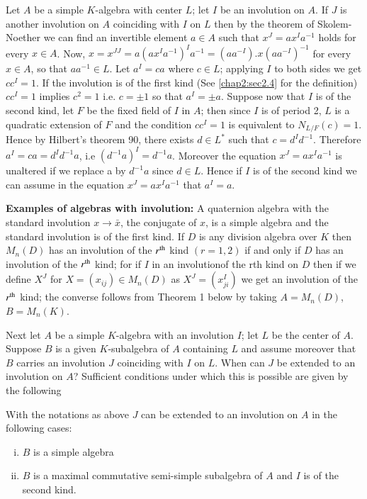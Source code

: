 Let $A$ be a simple $K$-algebra with center $L$; let $I$ be an
involution on $A$. If $J$ is another involution on $A$ coinciding with
$I$ on $L$ then by the theorem of Skolem-Noether we can find an
invertible element $a \in A$ such that $x^J = ax^I a^{-1}$ holds for
every $x \in A$. Now, $x = x^{JJ} = a (ax^I a^{-1})^I a^{-1} =
(aa^{-I}). x (aa^{-I})^{-1}$ for every $x \in A$, so that $aa^{-1} \in
L$. Let $a^{I}=ca$ where $c \in L$; applying $I$ to both sides we get
$cc^I = 1$. If the involution is of the first kind (See
\ref{chap2:sec2.4} for the 
definition) $cc^I = 1$ implies $c^2 = 1$ i.e. $c = \pm 1$ so that $a^I =
\pm a $. Suppose now that $I$ is of the second kind, let $F$ be the
fixed field of $I$ in $A$; then since $I$ is of period 2, $L$ is a
quadratic extension of $F$ and the condition $cc^I = 1$ is equivalent
to $N_{L/F} (c) = 1$. Hence by Hilbert's theorem 90, there exists
$d \in L^*$ such that $c = d^I d^{-1}$. Therefore $a^I = ca = d^I
d^{-1}a$, i.e $(d^{-1}a)^I = d^{-1} a$. Moreover the equation $x^J =
ax^I a^{-1}$ is unaltered if we replace a by $d^{-1}a$ since $d \in
L$. Hence if $I$ is of the second kind we can assume in the equation
$x^J = ax^I a^{-1}$ that $a^I = a$. 

  
\medskip
\noindent\textbf{Examples of algebras with involution:}
  A quaternion algebra with the standard involution $x \to \bar{x}$,
  the conjugate of $x$, is a simple algebra and the standard
  involution is of the first kind. If $D$ is any division algebra
  over $K$ then $M_n(D)$ has an involution of the $r^{\rm th}$ kind $(r =
  1,2)$ if and only if $D$ has an involution of the $r^{\rm th}$ kind; for
  if $I$ in an involution\pageoriginale of the rth kind on $D$ then if
  we define 
  $X^J$ for $X = (x_{ij}) \in M_n (D) $ as $X^J = (x^I_{ji})$  we get
  an involution of the $r^{\rm th}$ kind; the converse follows from Theorem 1
  below by taking $A = M_n(D)$, $B = M_n (K)$. 
  
  Next let $A$ be a simple $K$-algebra with an involution $I$; let $L$ be
  the center of $A$. Suppose $B$ is a given $K$-subalgebra of $A$
  containing $L$ and assume moreover that $B$ carries an involution
  $J$ coinciding with $I$ on $L$. When can $J$ be extended to an
  involution on $A$? Sufficient conditions under which this is
  possible are given by the following     

\begin{theorem*}
With the notations as above $J$ can be extended to an involution on
$A$ in the following cases: 
  \begin{enumerate}[i)]
\item  $B$ is a simple algebra

\item $B$ is a maximal commutative semi-simple subalgebra of $A$ and 
  $I$ is of the second kind. 
\end{enumerate}
\end{theorem*}

